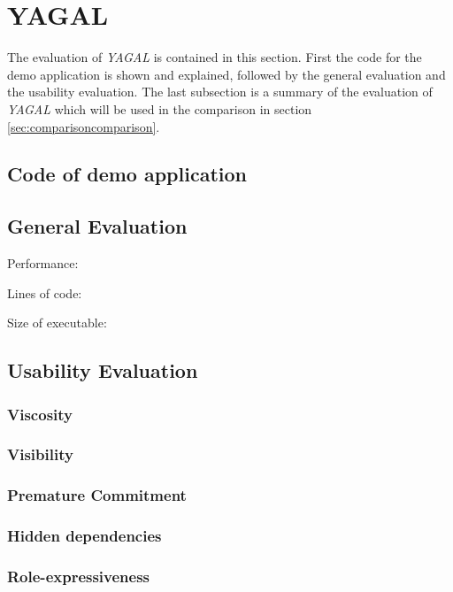 \section{YAGAL}
The evaluation of \textit{YAGAL} is contained in this section. First the code for the demo application is shown and explained, followed by the general evaluation and the usability evaluation. The last subsection is a summary of the evaluation of \textit{YAGAL} which will be used in the comparison in section \ref{sec:comparisoncomparison}.

\subsection{Code of demo application}

\subsection{General Evaluation}

Performance: 

Lines of code: 

Size of executable: 

\subsection{Usability Evaluation}

\subsubsection[*]{Viscosity}

\subsubsection[*]{Visibility}

\subsubsection[*]{Premature Commitment}

\subsubsection[*]{Hidden dependencies}

\subsubsection[*]{Role-expressiveness}

